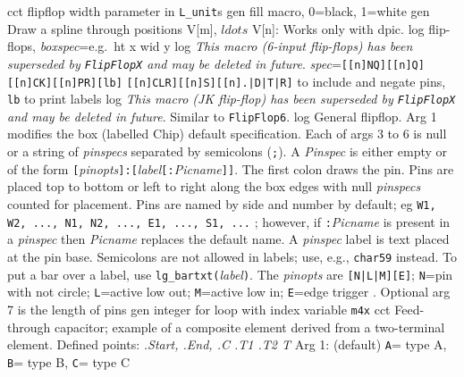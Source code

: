   {cct}
  {flipflop width parameter in {\tt L\_unit}s}
  {gen}
  {fill macro, 0=black, 1=white}
  {gen}
  {Draw a spline through positions V[m], $ldots$ V[n]: Works only with dpic.}
  {log}
  {flip-flops,
  {\sl boxspec}=e.g.\ ht x wid y }
  {log}
  {{\em This macro (6-input flip-flops)
    has been superseded by {\tt FlipFlopX} and may be deleted
    in future}.
    {\sl spec}={\tt [[n]NQ][[n]Q][[n]CK][[n]PR][lb]}
    {\tt [[n]CLR][[n]S][[n].|D|T|R]} to include and negate pins,
    {\tt lb} to print labels }
  {log}
  {{\em This macro (JK flip-flop)
    has been superseded by {\tt FlipFlopX} and may be deleted
    in future}.
   Similar to {\tt FlipFlop6}.}
  {log}
  {General flipflop.
   Arg 1 modifies the box (labelled Chip) default specification.
   Each of args 3 to 6 is null or a string of {\sl pinspecs}
   separated by semicolons ({\tt;}).  A {\sl Pinspec} is either empty
   or of the form
   {\tt[}{\sl pinopts}{\tt]:[}{\sl label}{\tt[:}{\sl Picname}{\tt]]}.
   The first colon draws the pin.
   Pins are placed top to bottom or left to right along the box edges with
   null {\sl pinspecs} counted for placement. Pins are named by side and number
   by default; eg {\tt W1, W2, ..., N1, N2, ..., E1, ..., S1, ...} ; however,
   if {\tt:}{\sl Picname} is present in a {\sl pinspec} then {\sl Picname}
   replaces the default name.
   A {\sl pinspec} label is text placed at the pin base. Semicolons are
   not allowed in labels; use, e.g., {\tt {}char59}
   instead.
   To put a bar over a label, use {\tt lg\_bartxt(}{\sl label}{\tt)}.
   The {\sl pinopts} are {\tt[N|L|M][E]};
 {\tt N}=pin with not circle;
 {\tt L}=active low out; {\tt M}=active low in;
 {\tt E}=edge trigger . Optional arg 7 is the length
 of pins}
  {gen}
  {integer for loop with index variable {\tt m4x} }
  {cct}
  {Feed-through capacitor; example of a composite element derived from
   a two-terminal element.  Defined points: {\sl .Start, .End, .C .T1 .T2 T}
   Arg 1: (default) {\tt A}= type A, {\tt B}= type B, {\tt C}= type C 
   }
